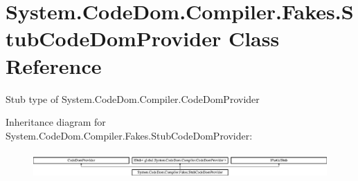 \hypertarget{class_system_1_1_code_dom_1_1_compiler_1_1_fakes_1_1_stub_code_dom_provider}{\section{System.\-Code\-Dom.\-Compiler.\-Fakes.\-Stub\-Code\-Dom\-Provider Class Reference}
\label{class_system_1_1_code_dom_1_1_compiler_1_1_fakes_1_1_stub_code_dom_provider}
}


Stub type of System.\-Code\-Dom.\-Compiler.\-Code\-Dom\-Provider 


Inheritance diagram for System.\-Code\-Dom.\-Compiler.\-Fakes.\-Stub\-Code\-Dom\-Provider\-:\begin{figure}[H]
\begin{center}
\leavevmode
\includegraphics[height=1.006289cm]{class_system_1_1_code_dom_1_1_compiler_1_1_fakes_1_1_stub_code_dom_provider}
\end{center}
\end{figure}
